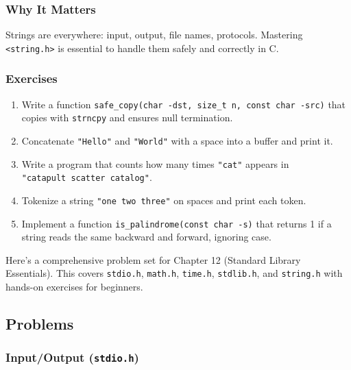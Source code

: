 \documentclass[
  letterpaper,
  DIV=11,
  numbers=noendperiod]{scrreprt}
\providecommand{\tightlist}{%
  \setlength{\itemsep}{0pt}\setlength{\parskip}{0pt}}
\begin{document}
\subsubsection{Why It Matters}\label{why-it-matters-54}

Strings are everywhere: input, output, file names, protocols. Mastering
\texttt{\textless{}string.h\textgreater{}} is essential to handle them
safely and correctly in C.

\subsubsection{Exercises}\label{exercises-59}

\begin{enumerate}
\def\labelenumi{\arabic{enumi}.}
\tightlist
\item
  Write a function
  \texttt{safe\_copy(char\ -dst,\ size\_t\ n,\ const\ char\ -src)} that
  copies with \texttt{strncpy} and ensures null termination.
\item
  Concatenate \texttt{"Hello"} and \texttt{"World"} with a space into a
  buffer and print it.
\item
  Write a program that counts how many times \texttt{"cat"} appears in
  \texttt{"catapult\ scatter\ catalog"}.
\item
  Tokenize a string \texttt{"one\ two\ three"} on spaces and print each
  token.
\item
  Implement a function \texttt{is\_palindrome(const\ char\ -s)} that
  returns 1 if a string reads the same backward and forward, ignoring
  case.
\end{enumerate}

Here's a comprehensive problem set for Chapter 12 (Standard Library
Essentials). This covers \texttt{stdio.h}, \texttt{math.h},
\texttt{time.h}, \texttt{stdlib.h}, and \texttt{string.h} with hands-on
exercises for beginners.

\subsection{Problems}\label{problems-10}

\subsubsection{\texorpdfstring{Input/Output
(\texttt{stdio.h})}{Input/Output (stdio.h)}}\label{inputoutput-stdio.h-1}
\end{document}
